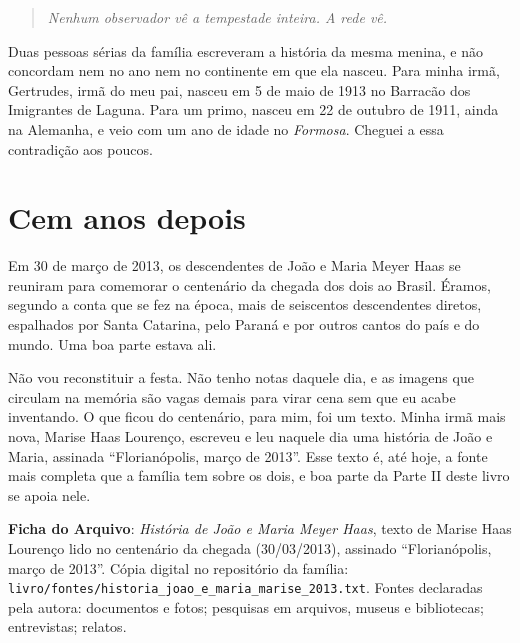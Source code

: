 \documentclass[
  brazilian,
  11pt,
  openany]{book}
\begin{document}
\begin{quote}
\emph{Nenhum observador vê a tempestade inteira. A rede vê.}
\end{quote}

Duas pessoas sérias da família escreveram a história da mesma menina, e
não concordam nem no ano nem no continente em que ela nasceu. Para minha
irmã, Gertrudes, irmã do meu pai, nasceu em 5 de maio de 1913 no
Barracão dos Imigrantes de Laguna. Para um primo, nasceu em 22 de
outubro de 1911, ainda na Alemanha, e veio com um ano de idade no
\emph{Formosa}. Cheguei a essa contradição aos poucos.

\section{Cem anos depois}\label{cem-anos-depois}

Em 30 de março de 2013, os descendentes de João e Maria Meyer Haas se
reuniram para comemorar o centenário da chegada dos dois ao Brasil.
Éramos, segundo a conta que se fez na época, mais de seiscentos
descendentes diretos, espalhados por Santa Catarina, pelo Paraná e por
outros cantos do país e do mundo. Uma boa parte estava ali.

Não vou reconstituir a festa. Não tenho notas daquele dia, e as imagens
que circulam na memória são vagas demais para virar cena sem que eu
acabe inventando. O que ficou do centenário, para mim, foi um texto.
Minha irmã mais nova, Marise Haas Lourenço, escreveu e leu naquele dia
uma história de João e Maria, assinada ``Florianópolis, março de 2013''.
Esse texto é, até hoje, a fonte mais completa que a família tem sobre os
dois, e boa parte da Parte II deste livro se apoia nele.

\begin{ficha}

\textbf{Ficha do Arquivo}: \emph{História de João e Maria Meyer Haas},
texto de Marise Haas Lourenço lido no centenário da chegada
(30/03/2013), assinado ``Florianópolis, março de 2013''. Cópia digital
no repositório da família:
\texttt{livro/fontes/historia\_joao\_e\_maria\_marise\_2013.txt}. Fontes
declaradas pela autora: documentos e fotos; pesquisas em arquivos,
museus e bibliotecas; entrevistas; relatos.

\end{ficha}
\end{document}
